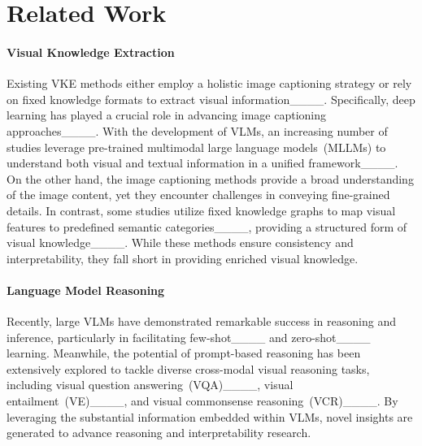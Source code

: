 \section{Related Work}
\label{sec:related}
\paragraph{Visual Knowledge Extraction}
Existing VKE methods either employ a holistic image captioning strategy or rely on fixed knowledge formats to extract visual information____.
Specifically, deep learning has played a crucial role in advancing image captioning approaches____.
With the development of VLMs, an increasing number of studies leverage pre-trained multimodal large language models~(MLLMs) to understand both visual and textual information in a unified framework____. 
On the other hand, the image captioning methods provide a broad understanding of the image content, yet they encounter challenges in conveying fine-grained details.
In contrast, some studies utilize fixed knowledge graphs to map visual features to predefined semantic categories____, providing a structured form of visual knowledge____. While these methods ensure consistency and interpretability, they fall short in providing enriched visual knowledge.
\paragraph{Language Model Reasoning}
Recently, large VLMs have demonstrated remarkable success in reasoning and inference, particularly in facilitating few-shot____ and zero-shot____ learning. 
Meanwhile, the potential of prompt-based reasoning has been extensively explored to tackle diverse cross-modal visual reasoning tasks, including visual question answering~(VQA)____, visual entailment~(VE)____, and visual commonsense reasoning~(VCR)____. 
By leveraging the substantial information embedded within VLMs, novel insights are generated to advance reasoning and interpretability research.